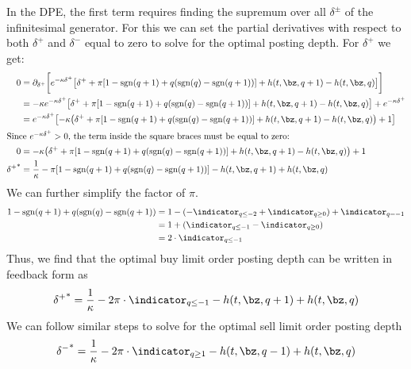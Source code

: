 \documentclass[12pt]{article}
\begin{document}
In the DPE, the first term requires finding the supremum over all $\delta^\pm$ of the infinitesimal generator. For this we can set the partial derivatives with respect to both $\delta^+$ and $\delta^-$ equal to zero to solve for the optimal posting depth. For $\delta^+$ we get:
\begin{align*}
0 & = \partial_{\delta^+} \biggl[ e^{ -\kappa \delta^{+}} \bigl[ \delta^+ + \pi [ 1 - \mathrm{sgn}(q+1) + q(\mathrm{sgn}(q) - \mathrm{sgn}(q+1) ) ] + h(t,\bz,q+1) - h(t,\bz,q) \bigr] \biggr] \\
& = -\kappa e^{ -\kappa \delta^{+}} \bigl[ \delta^+ + \pi [ 1 - \mathrm{sgn}(q+1) + q(\mathrm{sgn}(q) - \mathrm{sgn}(q+1) ) ] + h(t,\bz,q+1) - h(t,\bz,q) \bigr] + e^{ -\kappa \delta^{+}} \\
& = e^{ -\kappa \delta^{+}} \bigl[ -\kappa \bigl( \delta^+ + \pi [ 1 - \mathrm{sgn}(q+1) + q(\mathrm{sgn}(q) - \mathrm{sgn}(q+1) ) ] + h(t,\bz,q+1) - h(t,\bz,q) \bigr) + 1 \bigr] \\
\intertext{Since $e^{ -\kappa \delta^{+}}>0$, the term inside the square braces must be equal to zero:}
0 & = -\kappa \bigl( \delta^+ + \pi [ 1 - \mathrm{sgn}(q+1) + q(\mathrm{sgn}(q) - \mathrm{sgn}(q+1) ) ] + h(t,\bz,q+1) - h(t,\bz,q) \bigr) + 1 \\
{\delta^+}^* & = \frac{1}{\kappa} - \pi [ 1 - \mathrm{sgn}(q+1) + q(\mathrm{sgn}(q) - \mathrm{sgn}(q+1) ) ] - h(t,\bz,q+1) + h(t,\bz,q) 
\end{align*}
We can further simplify the factor of $\pi$.
\begin{align*}
1 - \mathrm{sgn}(q+1) + q(\mathrm{sgn}(q) - \mathrm{sgn}(q+1) )  & = 
1 - (- \indicator_{q \leq -2} + \indicator_{q \geq 0}) +  \indicator_{q = -1} \\
& = 1 + ( \indicator_{q \leq -1} -  \indicator_{q \geq 0} )\\
& = 2 \cdot \indicator_{q \leq -1}
\end{align*}
Thus, we find that the optimal buy limit order posting depth can be written in feedback form as
\begin{equation}
\label{eq:optbuydepthfeedback}
{\delta^+}^* = \frac{1}{\kappa} - 2 \pi \cdot \indicator_{q \leq -1} - h(t,\bz,q+1) + h(t,\bz,q) 
\end{equation}
We can follow similar steps to solve for the optimal sell limit order posting depth
\begin{equation}
\label{eq:optselldepthfeedback}
{\delta^-}^* = \frac{1}{\kappa} - 2 \pi \cdot \indicator_{q \geq 1} - h(t,\bz,q-1) + h(t,\bz,q) 
\end{equation}
\end{document}
